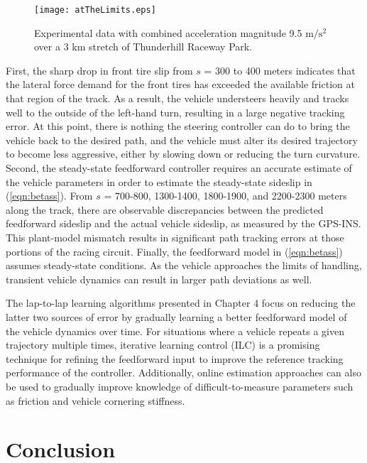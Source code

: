 \begin{figure}
\centering
\texttt{[image: atTheLimits.eps]}
\caption{Experimental data with combined acceleration magnitude 9.5 $\mathrm{m/s^2}$ over a 3 km stretch of Thunderhill Raceway Park.}
\label{fig:atTheLimits}
\end{figure}

First, the sharp drop in front tire slip from $s$ = 300 to 400 meters indicates that the 
 lateral force demand for the front tires has exceeded the available friction at that region of the track. As a result, the vehicle
 understeers heavily and tracks well to the outside of the left-hand turn, resulting in a large negative tracking error.
At this point, there is nothing the steering controller can do to bring the vehicle back to the desired path, and the vehicle must alter its
desired trajectory to become less aggressive, either by slowing down or reducing the turn curvature. Second, the steady-state feedforward controller requires an accurate estimate of the vehicle parameters in order to estimate
the steady-state sideslip in (\ref{eqn:betass}). From $s$ = 700-800, 1300-1400, 1800-1900, and 2200-2300 meters along the track, there are observable
discrepancies between the predicted feedforward sideslip and the actual vehicle sideslip, as measured by the GPS-INS. This plant-model mismatch results in significant path tracking errors at those portions of the racing circuit. Finally, the feedforward
model in (\ref{eqn:betass}) assumes steady-state conditions. As the vehicle approaches the limits of handling, transient vehicle
dynamics can result in larger path deviations as well.

The lap-to-lap learning algorithms presented in Chapter 4 focus on reducing the latter two sources of
 error by gradually learning a better feedforward model of the
vehicle dynamics over time. For situations where a vehicle repeats a 
given trajectory multiple times, iterative learning control (ILC)
is a promising technique for refining the feedforward input to improve
 the reference tracking performance of the controller. Additionally, online estimation
approaches can also be used to gradually improve knowledge 
of difficult-to-measure parameters such as friction and vehicle cornering
stiffness.

\section{Conclusion}


